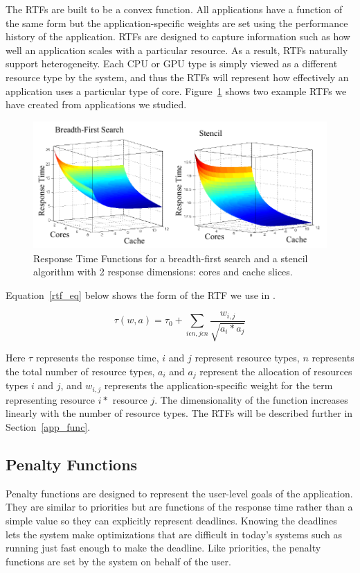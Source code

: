 The RTFs are built to be a convex function.  All applications have a function of the same form but the application-specific weights are set using the performance history of the application.  RTFs are designed to capture information such as how well an application scales with a particular resource. As a result, RTFs naturally support heterogeneity.  Each CPU or GPU type is simply viewed as a different resource type by the system, and thus the RTFs will represent how effectively an application uses a particular type of core. Figure~\ref{sample_rtf} shows two example RTFs we have created from applications we studied.

\begin{figure}[hb]
\includegraphics*[bb=0 0 426 184,width=1.0\columnwidth]{sample_rtf.pdf}
\caption{\label{sample_rtf} Response Time Functions for a breadth-first search and a stencil algorithm with 2 response dimensions: cores and cache slices.}
\end{figure}

Equation~\ref{rtf_eq} below shows the form of the RTF we use in \pacora.

\begin{equation}\label{rtf_eq}
\tau(w,a) = \tau_0 + \sum_{i\epsilon n,j\epsilon n}{\frac{w_{i,j}}{\sqrt{a_i * a_j}}}
\end{equation}

Here $\tau$ represents the response time, $i$ and $j$ represent resource types, $n$ represents the total number of resource types, $a_{i}$ and $a_{j}$ represent the allocation of resources types $i$ and $j$, and $w_{i,j}$ represents the application-specific weight for the term representing resource $i*$ resource $j$.  The dimensionality of the function increases linearly with the number of resource types. The RTFs will be described further in Section~\ref{app_func}.

\subsection*{Penalty Functions}
Penalty functions are designed to represent the user-level goals of the application. They are similar to priorities but are functions of the response time rather than a simple value so they can explicitly represent deadlines.  Knowing the deadlines lets the system make optimizations that are difficult in today's systems such as running just fast enough to make the deadline. Like priorities, the penalty functions are set by the system on behalf of the user.

